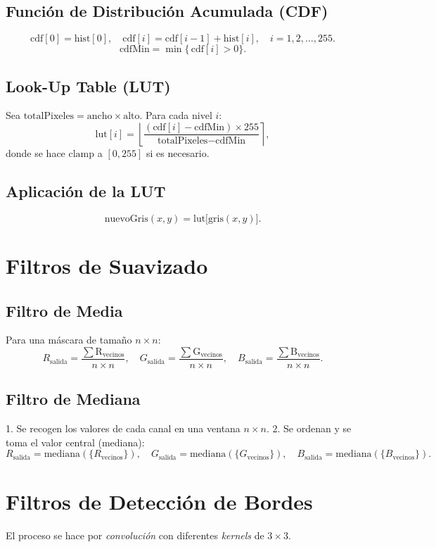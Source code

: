 \documentclass[11pt]{article}
\begin{document}
\subsection{Función de Distribución Acumulada (CDF)}
\[
\text{cdf}[0] = \text{hist}[0], \quad
\text{cdf}[i] = \text{cdf}[i - 1] + \text{hist}[i], \quad i = 1, 2, \ldots, 255.
\]
\[
\text{cdfMin} = \min \bigl\{\,\text{cdf}[i] > 0\bigr\}.
\]

\subsection{Look-Up Table (LUT)}
Sea \(\text{totalPixeles} = \text{ancho} \times \text{alto}\). Para cada nivel \(i\):
\[
\text{lut}[i] = \left\lfloor \frac{(\text{cdf}[i] - \text{cdfMin}) \times 255}{\text{totalPixeles} - \text{cdfMin}} \right\rceil,
\]
donde se hace \(\text{clamp}\) a \([0, 255]\) si es necesario.

\subsection{Aplicación de la LUT}
\[
\text{nuevoGris}(x, y) = \text{lut}\bigl[\text{gris}(x, y)\bigr].
\]

\section{Filtros de Suavizado}

\subsection{Filtro de Media}
Para una máscara de tamaño \(n \times n\):
\[
R_{\text{salida}} = \frac{ \sum \text{R}_{\text{vecinos}} }{n \times n}, \quad
G_{\text{salida}} = \frac{ \sum \text{G}_{\text{vecinos}} }{n \times n}, \quad
B_{\text{salida}} = \frac{ \sum \text{B}_{\text{vecinos}} }{n \times n}.
\]

\subsection{Filtro de Mediana}
1. Se recogen los valores de cada canal en una ventana \(n \times n\).
2. Se ordenan y se toma el valor central (mediana):
\[
R_{\text{salida}} = \text{mediana}(\{R_{\text{vecinos}}\}), \quad
G_{\text{salida}} = \text{mediana}(\{G_{\text{vecinos}}\}), \quad
B_{\text{salida}} = \text{mediana}(\{B_{\text{vecinos}}\}).
\]

\section{Filtros de Detección de Bordes}
El proceso se hace por \textit{convolución} con diferentes \textit{kernels} de \(3 \times 3\).
\end{document}
